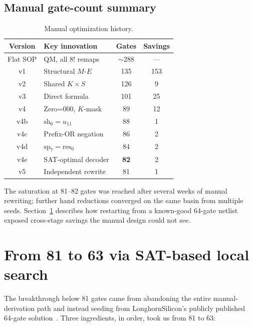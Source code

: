 \documentclass[11pt]{article}
\begin{document}
\subsection{Manual gate-count summary}

\begin{table}[h!]
  \centering
  \caption{Manual optimization history.}
  \label{tab:history}
  \begin{tabular}{clcc}
    \toprule
    Version & Key innovation & Gates & Savings \\
    \midrule
    Flat SOP & QM, all $8!$ remaps   & $\sim$288 & --- \\
    v1       & Structural $M$-$E$    & 135       & 153 \\
    v2       & Shared $K\times S$    & 126       & 9 \\
    v3       & Direct formula        & 101       & 25 \\
    v4       & Zero=000, $K$-mask    & 89        & 12 \\
    v4b      & $\text{sh}_6=u_{11}$  & 88        & 1 \\
    v4c      & Prefix-OR negation    & 86        & 2 \\
    v4d      & $\text{sp}_7=\text{res}_0$ & 84   & 2 \\
    v4e      & SAT-optimal decoder   & \textbf{82} & 2 \\
    v5       & Independent rewrite   & 81        & 1 \\
    \bottomrule
  \end{tabular}
\end{table}

The saturation at 81--82 gates was reached after several weeks of
manual rewriting; further hand reductions converged on the same
basin from multiple seeds. Section~\ref{sec:auto} describes how
restarting from a known-good 64-gate netlist exposed cross-stage
savings the manual design could not see.

\FloatBarrier
\section{From 81 to 63 via SAT-based local search}
\label{sec:auto}

The breakthrough below 81 gates came from abandoning the entire
manual-derivation path and instead seeding from
LonghornSilicon's publicly published 64-gate
solution~\cite{longhorn2024}.
Three ingredients, in order, took us from 81 to 63:
\end{document}
